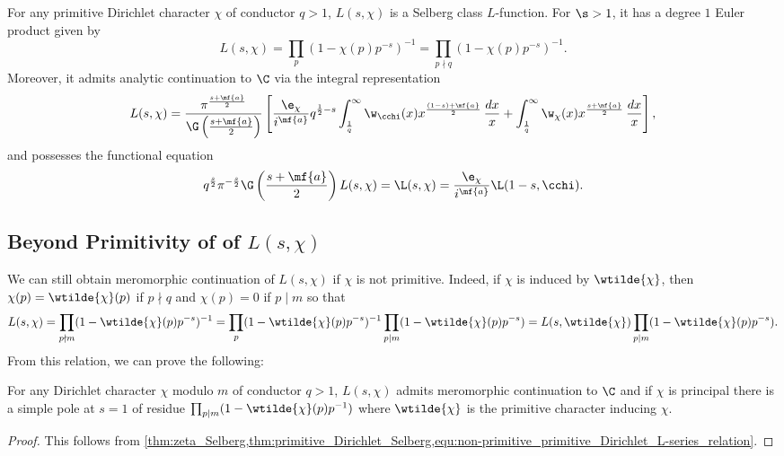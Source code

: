       \begin{theorem}\label{thm:primitive_Dirichlet_Selberg}
        For any primitive Dirichlet character $\chi$ of conductor $q > 1$, $L(s,\chi)$ is a Selberg class $L$-function. For $\s > 1$, it has a degree $1$ Euler product given by
        \[
          L(s,\chi) = \prod_{p}(1-\chi(p)p^{-s})^{-1} = \prod_{p \nmid q}(1-\chi(p)p^{-s})^{-1}.
        \]
        Moreover, it admits analytic continuation to $\C$ via the integral representation
        \[
          L(s,\chi) = \frac{\pi^{\frac{s+\mf{a}}{2}}}{\G\left(\frac{s+\mf{a}}{2}\right)}\left[\frac{\e_{\chi}}{i^{\mf{a}}}q^{\frac{1}{2}-s}\int_{\frac{1}{q}}^{\infty}\w_{\cchi}(x)x^{\frac{(1-s)+\mf{a}}{2}}\,\frac{dx}{x}+\int_{\frac{1}{q}}^{\infty}\w_{\chi}(x)x^{\frac{s+\mf{a}}{2}}\,\frac{dx}{x}\right],
        \]
        and possesses the functional equation
        \[
          q^{\frac{s}{2}}\pi^{-\frac{s}{2}}\G\left(\frac{s+\mf{a}}{2}\right)L(s,\chi) = \L(s,\chi) = \frac{\e_{\chi}}{i^{\mf{a}}}\L(1-s,\cchi).
        \]
      \end{theorem}
    \subsection*{Beyond Primitivity of of \texorpdfstring{$L(s,\chi)$}{L(s,\chi)}}
      We can still obtain meromorphic continuation of $L(s,\chi)$ if $\chi$ is not primitive. Indeed, if $\chi$ is induced by $\wtilde{\chi}$, then $\chi(p) = \wtilde{\chi}(p)$ if $p \nmid q$ and $\chi(p) = 0$ if $p \mid m$ so that
      \begin{equation}\label{equ:non-primitive_primitive_Dirichlet_L-series_relation}
        L(s,\chi) = \prod_{p \nmid m}(1-\wtilde{\chi}(p)p^{-s})^{-1} = \prod_{p}(1-\wtilde{\chi}(p)p^{-s})^{-1}\prod_{p \mid m}(1-\wtilde{\chi}(p)p^{-s}) = L(s,\wtilde{\chi})\prod_{p \mid m}(1-\wtilde{\chi}(p)p^{-s}).
      \end{equation}
      From this relation, we can prove the following:

      \begin{theorem}\label{thm:analytic_continuation_Dirichlet}
        For any Dirichlet character $\chi$ modulo $m$ of conductor $q > 1$, $L(s,\chi)$ admits meromorphic continuation to $\C$ and if $\chi$ is principal there is a simple pole at $s = 1$ of residue $\prod_{p \mid m}(1-\wtilde{\chi}(p)p^{-1})$ where $\wtilde{\chi}$ is the primitive character inducing $\chi$.
      \end{theorem}
      \begin{proof}
        This follows from \cref{thm:zeta_Selberg,thm:primitive_Dirichlet_Selberg,equ:non-primitive_primitive_Dirichlet_L-series_relation}. 
      \end{proof}

